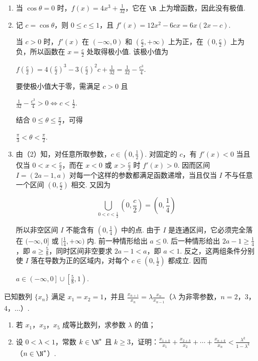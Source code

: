 \begin{solution}
\begin{enumerate}
\item 当 \(\cos\theta=0\) 时，\(f(x)=4x^{3}+\frac{1}{32}\)，它在 \(\R\) 上为增函数，因此没有极值.

\item 记 \(c=\cos\theta\)，则 \(0\leqslant c\leqslant 1\)，且 \(f'(x)=12x^{2}-6cx=6x(2x-c)\).

当 \(c>0\) 时，\(f'(x)\) 在 \((-\infty,0)\) 和 \(\left(\frac{c}{2},+\infty\right)\) 上为正，在 \(\left(0,\frac{c}{2}\right)\) 上为负，所以函数在 \(x=\frac{c}{2}\) 处取得极小值. 该极小值为

\(f\left(\frac{c}{2}\right)=4\left(\frac{c}{2}\right)^{3}-3\left(\frac{c}{2}\right)^{2}c+\frac{1}{32}=\frac{1}{32}-\frac{c^{3}}{4}\).

要使极小值大于零，需满足 \(c>0\) 且

\(\frac{1}{32}-\frac{c^{3}}{4}>0\Longleftrightarrow c<\frac{1}{2}\).

结合 \(0\leqslant\theta\leqslant\frac{\pi}{2}\)，可得

\(\frac{\pi}{3}<\theta<\frac{\pi}{2}\).

\item 由（2）知，对任意所取参数，\(c\in\left(0,\frac{1}{2}\right)\). 对固定的 \(c\)，有 \(f'(x)<0\) 当且仅当 \(0<x<\frac{c}{2}\)，而在 \(x<0\) 或 \(x>\frac{c}{2}\) 时 \(f'(x)>0\). 因而区间 \(I=(2a-1,a)\) 对每一个这样的参数都满足函数递增，当且仅当 \(I\) 不与任意一个区间 \(\left(0,\frac{c}{2}\right)\) 相交. 又因为

\[
\bigcup_{0<c<\frac{1}{2}}\left(0,\frac{c}{2}\right)=\left(0,\frac{1}{4}\right)
\]

所以非空区间 \(I\) 不能含有 \(\left(0,\frac{1}{4}\right)\) 中的点. 由于 \(I\) 是连通区间，它必须完全落在 \((-\infty,0]\) 或 \([\frac{1}{4},+\infty)\) 内. 前一种情形给出 \(a\leqslant0\). 后一种情形给出 \(2a-1\geqslant\frac{1}{4}\)，即 \(a\geqslant\frac{5}{8}\)，同时区间非空要求 \(2a-1<a\)，即 \(a<1\). 反之，这两组条件分别使 \(I\) 落在导数为正的区域内，对每个 \(c\in\left(0,\frac{1}{2}\right)\) 都成立. 因而

\(a\in\left(-\infty,0\right]\cup\left[\frac{5}{8},1\right)\).
\end{enumerate}
\end{solution}

\begin{problem}
已知数列 \(\{x_n\}\) 满足 \(x_1 = x_2 = 1\)，并且 \(\frac{x_{n+1}}{x_n} = \lambda \frac{x_n}{x_{n-1}}\)（\(\lambda\) 为非零参数，\(n = 2\)，\(3\)，\(4\)，\(\dots\)）.

\begin{enumerate}
\item 若 \(x_1\)，\(x_3\)，\(x_5\) 成等比数列，求参数 \(\lambda\) 的值；
\item 设 \(0 < \lambda < 1\)，常数 \(k \in \N^*\) 且 \(k \geqslant 3\)，证明：\(\frac{x_{1+k}}{x_1} + \frac{x_{2+k}}{x_2} + \cdots + \frac{x_{n+k}}{x_n} < \frac{\lambda^k}{1 - \lambda^k}\)（\(n \in \N^*\)）.
\end{enumerate}
\end{problem}

